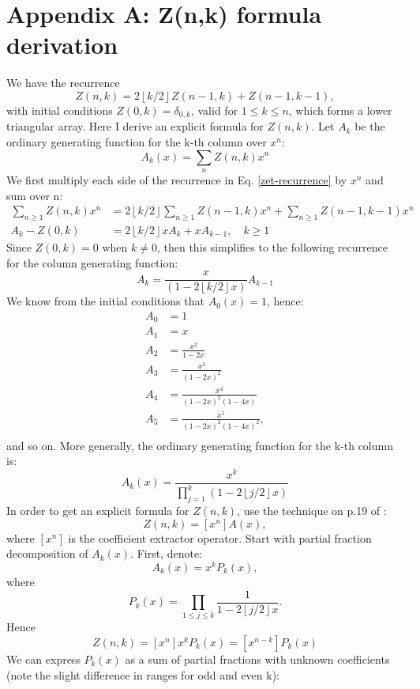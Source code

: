 \documentclass{article}
\newcommand{\floor}[1]{\left\lfloor #1 \right\rfloor}
\begin{document}
\section*{Appendix A: Z(n,k) formula derivation}
We have the recurrence
\begin{equation}\label{zet-recurrence}
Z(n,k) = 2\floor{k/2} Z(n-1,k)+Z(n-1,k-1),
\end{equation}
with initial conditions $Z(0,k) = \delta_{0,k}$, valid for $1 \leq k \leq n$, which forms a lower triangular array. 
Here I derive an explicit formula for $Z(n,k)$. Let $A_k$ be the ordinary generating function for the k-th column over $x^n$:
$$
A_k(x) = \sum_{n} Z(n,k) x^n
$$
We first multiply each side of the recurrence in Eq. \ref{zet-recurrence} by $x^n$ and sum over n:
$$
\begin{aligned}
\sum_{n \geq 1} Z(n,k)x^n &= 2\floor{k/2}\sum_{n \geq 1}Z(n-1,k)x^n + \sum_{n \geq 1} Z(n-1,k-1) x^n \\
A_k -Z(0,k)&=2\floor{k/2}x A_k+x A_{k-1}, \quad k \geq 1
\end{aligned}
$$
Since $Z(0,k) = 0$ when $k \neq 0$, then this simplifies to the following recurrence for the column generating function:
$$
A_k = \frac{x}{(1-2\floor{k/2}x)} A_{k-1}
$$
We know from the initial conditions that $A_0(x) = 1$, hence:
$$
\begin{aligned}
    A_0 &= 1 \\
    A_1 &= x \\
    A_2 &= \frac{x^2}{1-2x} \\
    A_3 &= \frac{x^3}{(1-2x)^2} \\
    A_4 &= \frac{x^4}{(1-2x)^2 (1-4x)} \\
    A_5 &= \frac{x^5}{(1-2x)^2 (1-4x)^2}, \\
\end{aligned}
$$
and so on. More generally, the ordinary generating function for the k-th column is:
\begin{equation}\label{column-ogf}
A_k(x) = \frac{x^k}{\prod_{j=1}^k(1-2\floor{j/2}x)}
\end{equation}
In order to get an explicit formula for $Z(n,k)$, use the technique on p.19 of \cite{wilfGeneratingfunctionologyThirdEdition2005}:
$$
Z(n,k) = [x^n]A(x),
$$
where $[x^n]$ is the coefficient extractor operator. Start with partial fraction decomposition of $A_k(x)$. First, denote:
$$
A_k(x) = x^kP_k(x),
$$
where
$$
P_k(x) = \prod_{1 \leq j \leq k}\frac{1}{1-2\floor{j/2}x}.
$$
Hence
\begin{equation}\label{znk-coef}
Z(n,k) = [x^n]x^kP_k(x) = [x^{n-k}]P_k(x)
\end{equation}
We can express $P_k(x)$ as a sum of partial fractions with unknown coefficients (note the slight difference in ranges for odd and even k):
\end{document}
